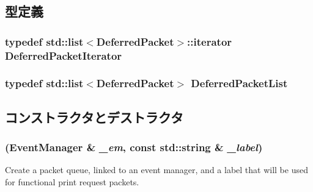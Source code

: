 \subsection{型定義}
\hypertarget{classPacketQueue_ad01f0c4d4677a8aeea2433ba7ef9f6fd}{
\subsubsection[{DeferredPacketIterator}]{\setlength{\rightskip}{0pt plus 5cm}typedef {\bf std::list}$<${\bf DeferredPacket}$>$::iterator {\bf DeferredPacketIterator}}}
\label{classPacketQueue_ad01f0c4d4677a8aeea2433ba7ef9f6fd}
\hypertarget{classPacketQueue_ae5fc25ae70b3044ebae593494f7f58c8}{
\subsubsection[{DeferredPacketList}]{\setlength{\rightskip}{0pt plus 5cm}typedef {\bf std::list}$<${\bf DeferredPacket}$>$ {\bf DeferredPacketList}}}
\label{classPacketQueue_ae5fc25ae70b3044ebae593494f7f58c8}


\subsection{コンストラクタとデストラクタ}
\hypertarget{classPacketQueue_aa30b1ba397193e7094a87b2a945f7237}{
\subsubsection[{PacketQueue}]{ ({\bf EventManager} \& {\em \_\-em}, \/  const std::string \& {\em \_\-label})}}
\label{classPacketQueue_aa30b1ba397193e7094a87b2a945f7237}
Create a packet queue, linked to an event manager, and a label that will be used for functional print request packets.


